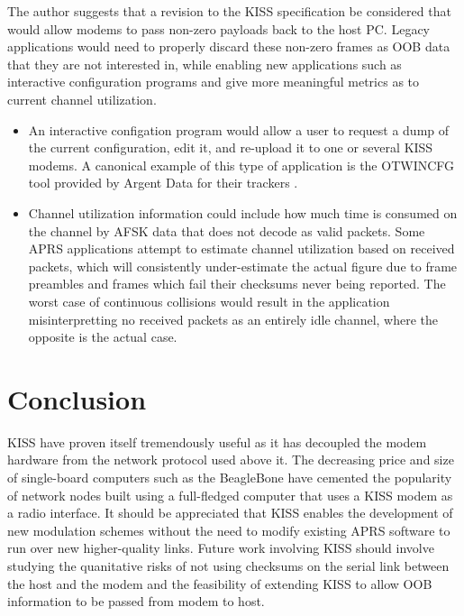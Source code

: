 The author suggests that a revision to the KISS specification be considered
that would allow modems to pass non-zero payloads back to the host PC.
Legacy applications would need to properly discard these non-zero frames
as OOB data that they are not interested in,
while enabling new applications such as interactive configuration programs
and give more meaningful metrics as to current channel utilization.
\begin{itemize}
	\item An interactive configation program would allow a user
		to request a dump of the current configuration, edit it, and
		re-upload it to one or several KISS modems. A canonical example
		of this type of application is the OTWINCFG tool 
		provided by Argent Data for their trackers \cite[\S17.6]{ot3manual}.
	\item Channel utilization information could include how much time
		is consumed on the channel by AFSK data that does not decode as
		valid packets. Some APRS applications attempt to estimate channel
		utilization based on received packets, which will consistently
		under-estimate the actual figure due to frame preambles
		and frames which fail their checksums never being reported.
		The worst case of continuous collisions would result in
		the application misinterpretting no received packets as
		an entirely idle channel, where the opposite is the actual case.
\end{itemize}

\section{Conclusion}

KISS have proven itself tremendously useful as it has decoupled the modem
hardware from the network protocol used above it.
The decreasing price and size of single-board computers such as the
BeagleBone have cemented the popularity of network nodes built using
a full-fledged computer that uses a KISS modem as a radio interface.
It should be appreciated that KISS enables the development of new
modulation schemes without the need to modify existing APRS software
to run over new higher-quality links.
Future work involving KISS should involve studying the quanitative risks
of not using checksums on the serial link between the host and the modem
and the feasibility of extending KISS to allow OOB information to be passed
from modem to host.

